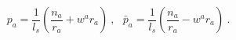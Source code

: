 \begin{equation}
p_a = \frac{1}{l_s}\left(\frac{n_a}{r_a}+w^ar_a\right)  ~,~~~
\bar{p}_a =\frac{1}{l_s}\left(\frac{n_a}{r_a}-w^ar_a\right) ~.
\label{T4 momenta 2}
\end{equation} 
